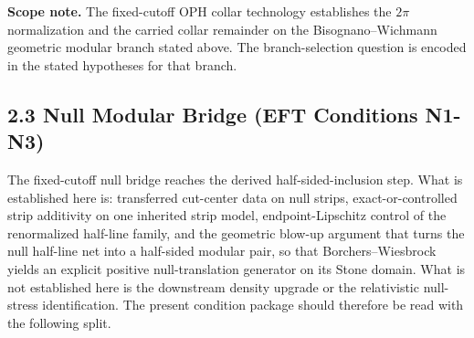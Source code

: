 \textbf{Scope note.} The fixed-cutoff OPH collar technology establishes the \(2\pi\) normalization and the carried collar remainder on the Bisognano--Wichmann geometric modular branch stated above. The branch-selection question is encoded in the stated hypotheses for that branch.

\subsection{2.3 Null Modular Bridge (EFT Conditions N1-N3)}\label{23-null-modular-bridge-eft-conditions-n1-n3}

The fixed-cutoff null bridge reaches the derived half-sided-inclusion step. What is established here is: transferred cut-center data on null strips, exact-or-controlled strip additivity on one inherited strip model, endpoint-Lipschitz control of the renormalized half-line family, and the geometric blow-up argument that turns the null half-line net into a half-sided modular pair, so that Borchers--Wiesbrock yields an explicit positive null-translation generator on its Stone domain. What is not established here is the downstream density upgrade or the relativistic null-stress identification. The present condition package should therefore be read with the following split.

